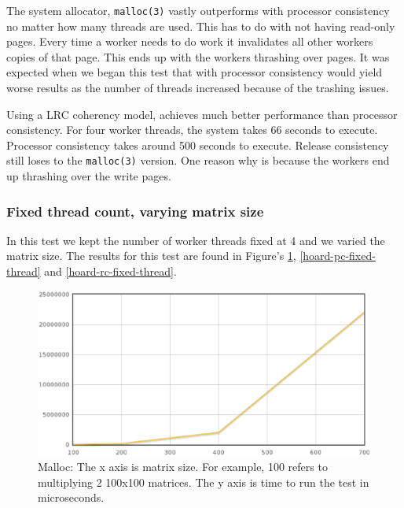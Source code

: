 The system allocator, \verb,malloc(3), vastly outperforms \projname{} with processor consistency no matter how many threads are used.  This has to do with not having read-only pages.  Every time a worker needs to do work it invalidates all other workers copies of that page.  This ends up with the workers thrashing over pages.  It was expected when we began this test that \projname{} with processor consistency would yield worse results as the number of threads increased because of the trashing issues.

Using a LRC coherency model, \projname{} achieves much better performance than processor consistency.  For four worker threads, the system takes 66 seconds to execute.  Processor consistency takes around 500 seconds to execute.  Release consistency still loses to the \verb,malloc(3), version.  One reason why is because the workers end up thrashing over the write pages.

\subsubsection{Fixed thread count, varying matrix size}

In this test we kept the number of worker threads fixed at 4 and we varied the matrix size. The results for this test are found in Figure's \ref{malloc-fixed-thread}, \ref{hoard-pc-fixed-thread} and \ref{hoard-rc-fixed-thread}.

\begin{figure}[!h]
\centering
\includegraphics[scale=0.40]{images/malloc-fixed-thread.eps}
\caption{Malloc: The x axis is matrix size. For example, 100 refers to multiplying 2 100x100 matrices. The y axis is time to run the test in microseconds.}
\label{malloc-fixed-thread}
\end{figure}

